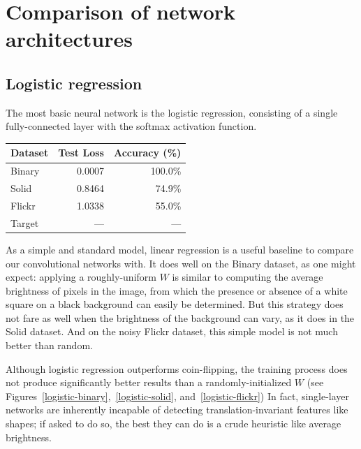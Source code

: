 \documentclass{article}
\newcommand{\dataset}[1]{\textsf{#1}}
\begin{document}
\section{Comparison of network architectures}
  \subsection{Logistic regression}

    The most basic neural network is the logistic regression, consisting of a single fully-connected layer with the softmax activation function.

    \begin{table}[h]
      \centering
      \begin{tabular}{lrr}\toprule
        \textbf{Dataset} & \textbf{Test Loss} & \textbf{Accuracy (\%)}\\\midrule
        \dataset{Binary} & 0.0007 & 100.0\% \\
        \dataset{Solid}  & 0.8464 &  74.9\% \\ %
        \dataset{Flickr} & 1.0338 &  55.0\% \\ %
        \dataset{Target} &    --- &     --- \\ \bottomrule
      \end{tabular}
    \end{table}

    As a simple and standard model, linear regression is a useful baseline to compare our convolutional networks with. It does well on the \dataset{\dataset{Binary}} dataset, as one might expect: applying a roughly-uniform $W$ is similar to computing the average brightness of pixels in the image, from which the presence or absence of a white square on a black background can easily be determined. But this strategy does not fare as well when the brightness of the background can vary, as it does in the \dataset{Solid} dataset. And on the noisy \dataset{Flickr} dataset, this simple model is not much better than random.

    Although logistic regression outperforms coin-flipping, the training process does not produce significantly better results than a randomly-initialized $W$ (see Figures~\ref{logistic-binary},~\ref{logistic-solid}, and~\ref{logistic-flickr}) In fact, single-layer networks are inherently incapable of detecting translation-invariant features like shapes; if asked to do so, the best they can do is a crude heuristic like average brightness.
\end{document}
